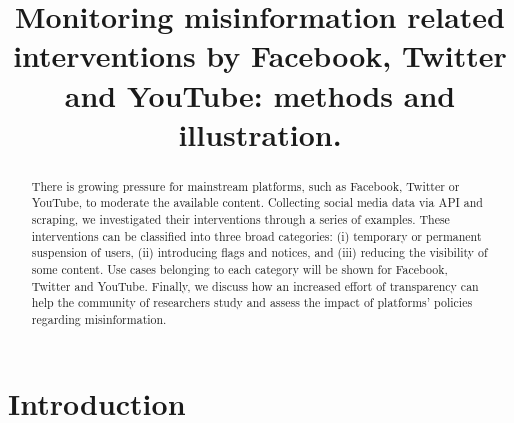 \documentclass{article}
\begin{document}
\title{Monitoring misinformation related interventions by Facebook, Twitter and YouTube: methods and illustration.}

\maketitle







\begin{abstract}

There is growing pressure for mainstream platforms, such as Facebook, Twitter or YouTube, to moderate the available content. 
Collecting social media data via API and scraping, we investigated their interventions through a series of examples. 
These interventions can be classified into three broad categories: 
(i) temporary or permanent suspension of users, 
(ii) introducing flags and notices, and 
(iii) reducing the visibility of some content. 
Use cases belonging to each category will be shown for Facebook, Twitter and YouTube. 
Finally, we discuss how an increased effort of transparency can help the community of researchers study and assess the impact of platforms' policies regarding misinformation. 

\end{abstract}

\section{Introduction}
\end{document}
